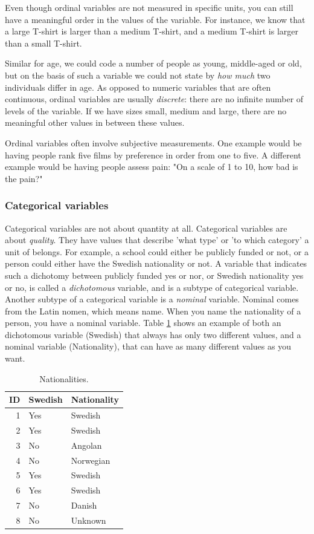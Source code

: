 \documentclass[]{report}\usepackage[]{graphicx}\usepackage[]{color}
\begin{document}
Even though ordinal variables are not measured in specific units, you can still have a meaningful order in the values of the variable. For instance, we know that a large T-shirt is larger than a medium T-shirt, and a medium T-shirt is larger than a small T-shirt.

Similar for age, we could code a number of people as young, middle-aged or old, but on the basis of such a variable we could not state by \textit{how much} two individuals differ in age. As opposed to numeric variables that are often continuous, ordinal variables are usually \textit{discrete}: there are no infinite number of levels of the variable. If we have sizes small, medium and large, there are no meaningful other values in between these values.

Ordinal variables often involve subjective measurements. One example would be having people rank five films by preference in order from one to five. A different example would be having people assess pain: "On a scale of 1 to 10, how bad is the pain?"

\subsubsection{Categorical variables}

Categorical variables are not about quantity at all. Categorical variables are about \textit{quality}. They have values that describe 'what type' or 'to which category' a unit of belongs. For example, a school could either be publicly funded or not, or a person could either have the Swedish nationality or not. A variable that indicates such a dichotomy between publicly funded yes or nor, or Swedish nationality yes or no, is called a \textit{dichotomous} variable, and is a subtype of categorical variable. Another subtype of a categorical variable is a \textit{nominal} variable. Nominal comes from the Latin nomen, which means name. When you name the nationality of a person, you have a nominal variable. Table \ref{tab:data_9} shows an example of both an dichotomous variable (Swedish) that always has only two different values, and a nominal variable (Nationality), that can have as many different values as you want.

\begin{table}[ht]
\centering
\caption{Nationalities.} 
\label{tab:data_9}
\begin{tabular}{rll}
  \hline
ID & Swedish & Nationality \\ 
  \hline
1 & Yes & Swedish \\ 
  2 & Yes & Swedish \\ 
  3 & No & Angolan \\ 
  4 & No & Norwegian \\ 
  5 & Yes & Swedish \\ 
  6 & Yes & Swedish \\ 
  7 & No & Danish \\ 
  8 & No & Unknown \\ 
   \hline
\end{tabular}
\end{table}
\end{document}
